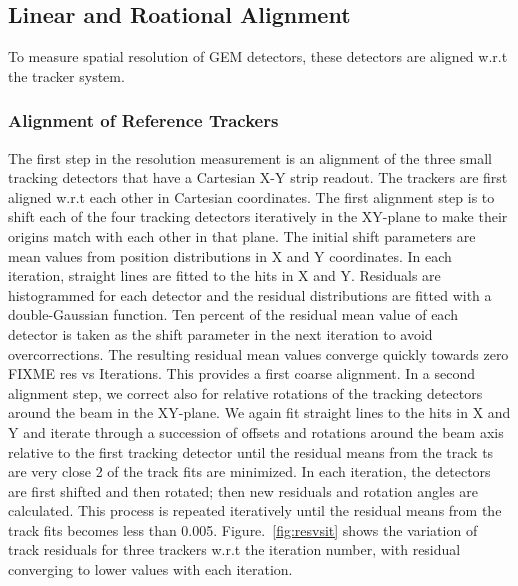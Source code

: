  
\subsection{Linear and Roational Alignment}

 To measure spatial resolution of GEM detectors, these detectors are aligned w.r.t the tracker system.
\subsubsection{Alignment of Reference Trackers}
The first step in the resolution measurement is an alignment of the three small tracking detectors that have a Cartesian X-Y strip readout. The trackers are first aligned w.r.t each other in Cartesian coordinates. The first alignment step is to shift each of the four tracking detectors iteratively in the XY-plane to make their origins match with each other in that plane. The initial shift parameters are mean values from position distributions in X and Y coordinates. In each iteration, straight lines are fitted to the hits in X and Y. Residuals are histogrammed for each detector and the residual distributions are fitted with a double-Gaussian function. Ten percent of the residual mean value of each detector is taken as the shift parameter in the next iteration to avoid overcorrections. The resulting residual mean values converge quickly towards zero FIXME res vs Iterations. This provides a first coarse alignment. In a second alignment step, we correct also for relative rotations of the tracking detectors around the beam in the XY-plane. We again fit straight lines to the hits in X and Y and iterate through a succession of offsets and rotations around the beam axis relative to the first tracking detector until the residual means from the track ts are very close 2 of the track fits are minimized. In each iteration, the detectors are first shifted and then rotated; then new residuals and rotation angles are calculated. This process is repeated iteratively until the residual means from the track fits becomes less than 0.005. Figure.~\ref{fig:resvsit} shows the variation of track residuals for three trackers w.r.t the iteration number, with residual converging to lower values with each iteration.
